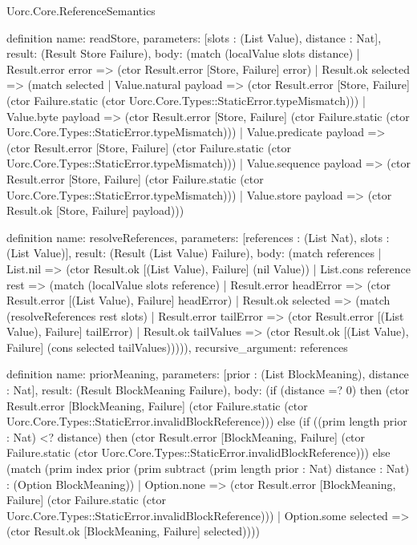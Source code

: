 \begin{lexlean}{Uorc.Core.ReferenceSemantics}
\begin{semanticmodule}
definition{
  name: readStore,
  parameters: [slots : (List Value), distance : Nat],
  result: (Result Store Failure),
  body: (match (localValue slots distance)
    | Result.error error => (ctor Result.error [Store, Failure] error)
    | Result.ok selected => (match selected
      | Value.natural payload => (ctor Result.error [Store, Failure] (ctor Failure.static (ctor Uorc.Core.Types::StaticError.typeMismatch)))
      | Value.byte payload => (ctor Result.error [Store, Failure] (ctor Failure.static (ctor Uorc.Core.Types::StaticError.typeMismatch)))
      | Value.predicate payload => (ctor Result.error [Store, Failure] (ctor Failure.static (ctor Uorc.Core.Types::StaticError.typeMismatch)))
      | Value.sequence payload => (ctor Result.error [Store, Failure] (ctor Failure.static (ctor Uorc.Core.Types::StaticError.typeMismatch)))
      | Value.store payload => (ctor Result.ok [Store, Failure] payload)))
}

definition{
  name: resolveReferences,
  parameters: [references : (List Nat), slots : (List Value)],
  result: (Result (List Value) Failure),
  body: (match references
    | List.nil => (ctor Result.ok [(List Value), Failure] (nil Value))
    | List.cons reference rest => (match (localValue slots reference)
      | Result.error headError => (ctor Result.error [(List Value), Failure] headError)
      | Result.ok selected => (match (resolveReferences rest slots)
        | Result.error tailError => (ctor Result.error [(List Value), Failure] tailError)
        | Result.ok tailValues => (ctor Result.ok [(List Value), Failure] (cons selected tailValues))))),
  recursive_argument: references
}

definition{
  name: priorMeaning,
  parameters: [prior : (List BlockMeaning), distance : Nat],
  result: (Result BlockMeaning Failure),
  body: (if (distance =? 0) then (ctor Result.error [BlockMeaning, Failure] (ctor Failure.static (ctor Uorc.Core.Types::StaticError.invalidBlockReference))) else (if ((prim length prior : Nat) <? distance) then (ctor Result.error [BlockMeaning, Failure] (ctor Failure.static (ctor Uorc.Core.Types::StaticError.invalidBlockReference))) else (match (prim index prior (prim subtract (prim length prior : Nat) distance : Nat) : (Option BlockMeaning))
    | Option.none => (ctor Result.error [BlockMeaning, Failure] (ctor Failure.static (ctor Uorc.Core.Types::StaticError.invalidBlockReference)))
    | Option.some selected => (ctor Result.ok [BlockMeaning, Failure] selected))))
}


\end{semanticmodule}
\end{lexlean}

